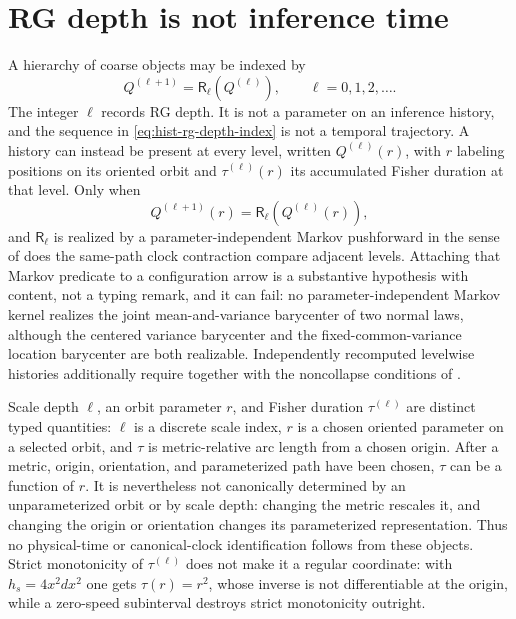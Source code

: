 \section{RG depth is not inference time}
\label{sec:hist-rg-depth-not-time}

A hierarchy of coarse objects may be indexed by
\begin{equation}
Q^{(\ell+1)}=\mathsf R_\ell(Q^{(\ell)}),
\qquad \ell=0,1,2,\ldots.
\label{eq:hist-rg-depth-index}
\end{equation}
The integer $\ell$ records RG depth.  It is not a parameter on an inference
history, and the sequence in \eqref{eq:hist-rg-depth-index} is not a temporal
trajectory.  A history can instead be present at every level, written
$Q^{(\ell)}(r)$, with $r$ labeling positions on its oriented orbit and
$\tau^{(\ell)}(r)$ its accumulated Fisher duration at that level.  Only
when
\begin{equation}
Q^{(\ell+1)}(r)
=\mathsf R_\ell(Q^{(\ell)}(r)),
\label{eq:hist-levelwise-same-path-image}
\end{equation}
and $\mathsf R_\ell$ is realized by a parameter-independent Markov pushforward
in the sense of  does the same-path
clock contraction compare adjacent levels.  Attaching that Markov predicate to
a configuration arrow is a substantive hypothesis with content, not a typing
remark, and it can fail: no parameter-independent Markov kernel realizes the
joint mean-and-variance barycenter of two normal laws, although the centered
variance barycenter and the fixed-common-variance location barycenter are both
realizable.  Independently recomputed levelwise histories additionally require
 together with the noncollapse conditions
of .  

Scale depth $\ell$, an orbit parameter $r$, and Fisher duration
$\tau^{(\ell)}$ are distinct typed quantities: $\ell$ is a discrete scale
index, $r$ is a chosen oriented parameter on a selected orbit, and $\tau$ is
metric-relative arc length from a chosen origin.  After a metric, origin,
orientation, and parameterized path have been chosen, $\tau$ can be a
function of $r$.  It is nevertheless not canonically determined by an
unparameterized orbit or by scale depth: changing the metric rescales it, and
changing the origin or orientation changes its parameterized representation.
Thus no physical-time or canonical-clock identification follows from these
objects.  Strict monotonicity of $\tau^{(\ell)}$ does not make it a regular
coordinate: with $h_s=4x^2dx^2$ one gets $\tau(r)=r^2$, whose inverse is not
differentiable at the origin, while a zero-speed subinterval destroys strict
monotonicity outright.  

